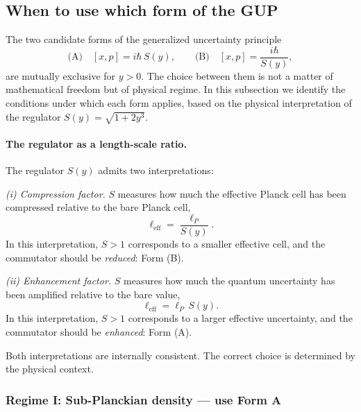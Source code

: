 \documentclass[a4paper,7pt,oneside,openany]{book}
\begin{document}
\subsection{When to use which form of the GUP}
\label{sec:when-GUP}

The two candidate forms of the generalized uncertainty principle
\begin{equation}
\text{(A)}\quad [x,p]=i\hbar\,S(y),
\qquad
\text{(B)}\quad [x,p]=\frac{i\hbar}{S(y)},
\label{eq:AB}
\end{equation}
are mutually exclusive for $y>0$. The choice between them is not 
a matter of mathematical freedom but of physical regime. In this 
subsection we identify the conditions under which each form 
applies, based on the physical interpretation of the regulator 
$S(y)=\sqrt{1+2y^{3}}$.

\paragraph{The regulator as a length-scale ratio.}
The regulator $S(y)$ admits two interpretations:

\emph{(i) Compression factor.} $S$ measures how much the 
effective Planck cell has been compressed relative to the bare 
Planck cell,
\begin{equation}
\ell_{\text{eff}}=\frac{\ell_{P}}{S(y)}.
\label{eq:l-eff-compression}
\end{equation}
In this interpretation, $S>1$ corresponds to a smaller effective 
cell, and the commutator should be \emph{reduced}: Form (B).

\emph{(ii) Enhancement factor.} $S$ measures how much the 
quantum uncertainty has been amplified relative to the bare 
value,
\begin{equation}
\ell_{\text{eff}}=\ell_{P}\,S(y).
\label{eq:l-eff-enhancement}
\end{equation}
In this interpretation, $S>1$ corresponds to a larger effective 
uncertainty, and the commutator should be \emph{enhanced}: Form 
(A).

Both interpretations are internally consistent. The correct 
choice is determined by the physical context.

\subsubsection{Regime I: Sub-Planckian density --- use Form A}
\end{document}
